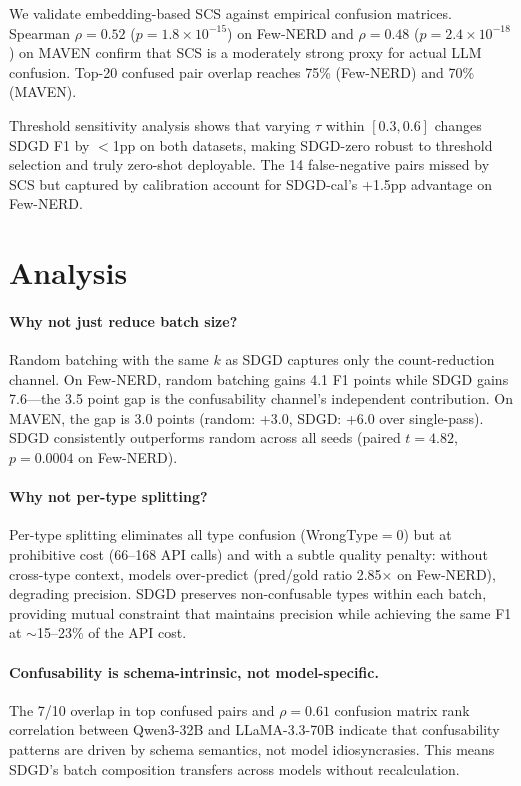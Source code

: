 \documentclass[11pt,a4paper]{article}
\begin{document}
We validate embedding-based SCS against empirical confusion matrices.
Spearman $\rho{=}0.52$ ($p{=}1.8{\times}10^{-15}$) on Few-NERD and $\rho{=}0.48$ ($p{=}2.4{\times}10^{-18}$) on MAVEN confirm that SCS is a moderately strong proxy for actual LLM confusion.
Top-20 confused pair overlap reaches 75\% (Few-NERD) and 70\% (MAVEN).

Threshold sensitivity analysis shows that varying $\tau$ within $[0.3, 0.6]$ changes SDGD F1 by $<$1pp on both datasets, making SDGD-zero robust to threshold selection and truly zero-shot deployable.
The 14 false-negative pairs missed by SCS but captured by calibration account for SDGD-cal's +1.5pp advantage on Few-NERD.

\section{Analysis}
\label{sec:analysis}

\paragraph{Why not just reduce batch size?}
Random batching with the same $k$ as SDGD captures only the count-reduction channel.
On Few-NERD, random batching gains 4.1 F1 points while SDGD gains 7.6---the 3.5 point gap is the confusability channel's independent contribution.
On MAVEN, the gap is 3.0 points (random: +3.0, SDGD: +6.0 over single-pass).
SDGD consistently outperforms random across all seeds (paired $t{=}4.82$, $p{=}0.0004$ on Few-NERD).

\paragraph{Why not per-type splitting?}
Per-type splitting eliminates all type confusion (WrongType$=$0) but at prohibitive cost (66--168 API calls) and with a subtle quality penalty: without cross-type context, models over-predict (pred/gold ratio 2.85$\times$ on Few-NERD), degrading precision.
SDGD preserves non-confusable types within each batch, providing mutual constraint that maintains precision while achieving the same F1 at ${\sim}$15--23\% of the API cost.

\paragraph{Confusability is schema-intrinsic, not model-specific.}
The 7/10 overlap in top confused pairs and $\rho{=}0.61$ confusion matrix rank correlation between Qwen3-32B and LLaMA-3.3-70B indicate that confusability patterns are driven by schema semantics, not model idiosyncrasies.
This means SDGD's batch composition transfers across models without recalculation.
\end{document}

